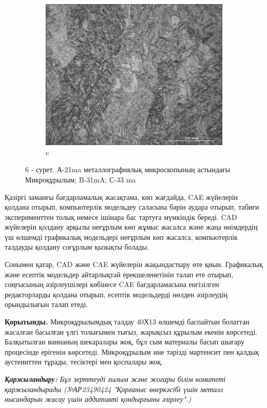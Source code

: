 \begin{figure}[H]
\begin{subfigure}[t]{0.3\textwidth}
        \centering
        \includegraphics[width=\textwidth]{media/ict2/image195}
        \caption*{c}
    \end{subfigure}
    \caption*{6 - сурет. А-21ma металлографиялық микроскопының астындағы Микроқұрылым; B-31mA; С-33 ma}
\end{figure}

\begin{multicols}{2}
Қазіргі заманғы бағдарламалық жасақтама, көп жағдайда, CAE жүйелерін
қолдана отырып, компьютерлік модельдеу саласына бәрін аудара отырып,
табиғи эксперименттен толық немесе ішінара бас тартуға мүмкіндік береді.
CAD жүйелерін қолдану арқылы неғұрлым көп жұмыс жасалса және жаңа
өнімдердің үш өлшемді графикалық модельдері неғұрлым көп жасалса,
компьютерлік талдауды қолдану соғұрлым қызықты болады.

Сонымен қатар, CAD және CAE жүйелерін жақындастыру өте қиын. Графикалық
және есептік модельдер айтарлықтай ерекшеленетінін талап ете отырып,
соңғысының әзірлеушілері көбінесе CAE бағдарламасына енгізілген
редакторларды қолдана отырып, есептік модельдерді нөлден әзірлеудің
орындылығын талап етеді.

{\bfseries Қорытынды.} Микроқұрылымдық талдау 40Х13 өлшемді баспайтын
болаттан жасалған басылған үлгі толығымен тығыз, жарықсыз құрылым екенін
көрсетеді. Балқытылған ваннаның шекаралары жоқ, бұл сым материалы басып
шығару процесінде ерігенін көрсетеді. Микроқұрылым ине тәрізді мартенсит
пен қалдық аустениттен тұрады, тесіктері мен қоспалары жоқ\emph{.}

\emph{{\bfseries Қаржыландыру:} Бұл зерттеуді ғылым және жоғары білім
комитеті қаржыландырады (№АР23490424 "Қорғаныс өнеркәсібі үшін металл
нысандарын жасау үшін аддитивті қондырғыны әзірлеу".)}
\end{multicols}

